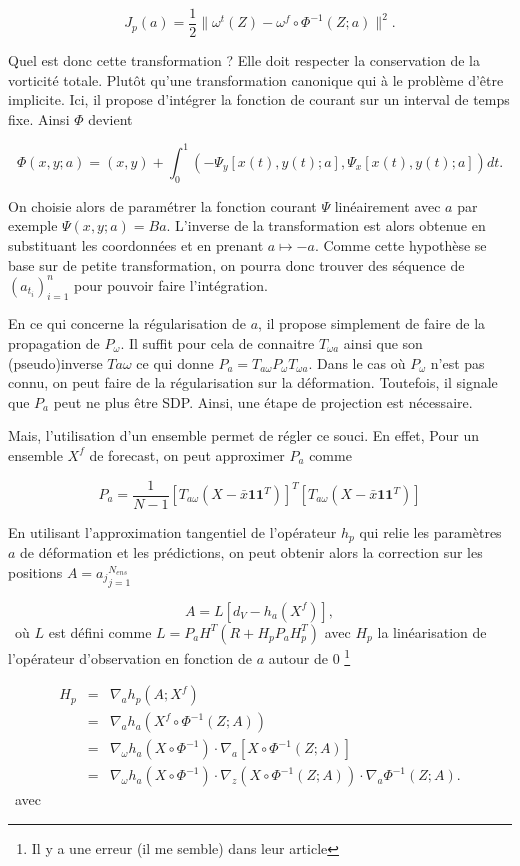 \documentclass{article}
\newcommand{\norm}[1]{\|#1\|}
\begin{document}
$$
    J_p(a) = \frac12 \norm{\omega^t(Z) - \omega^f \circ \Phi^{-1}(Z;a)}^2.
$$

Quel est donc cette transformation ? Elle doit respecter la conservation de la vorticité totale. Plutôt qu'une transformation canonique qui à le problème d'être implicite. Ici, il propose d'intégrer la fonction de courant sur un interval de temps fixe.
Ainsi $\Phi$ devient

$$
    \Phi(x,y;a) = (x, y) + \int_0^1 \left(-\Psi_y[x(t),y(t); a], \Psi_x[x(t), y(t); a]\right)dt.
$$

On choisie alors de paramétrer la fonction courant $\Psi$ linéairement avec $a$ par exemple $\Psi(x,y; a) = B a$. L'inverse de la transformation est alors obtenue en substituant les coordonnées et en prenant $a \mapsto -a$. Comme cette hypothèse se base sur de petite transformation, on pourra donc trouver des séquence de $(a_{t_i})_{i=1}^{n}$ pour pouvoir faire l'intégration.

En ce qui concerne la régularisation de $a$, il propose simplement de faire de la propagation de $P_{\omega}$. Il suffit pour cela de connaitre $T_{\omega a}$ ainsi que son (pseudo)inverse $T{a \omega}$ ce qui donne $P_a = T_{a \omega} P_{\omega} T_{\omega a}$. Dans le cas où $P_{\omega}$ n'est pas connu, on peut faire de la régularisation sur la déformation. Toutefois, il signale que $P_a$ peut ne plus être SDP. Ainsi, une étape de projection est nécessaire.

Mais, l'utilisation d'un ensemble permet de régler ce souci. En effet, Pour un ensemble $X^f$ de forecast, on peut approximer $P_a$ comme

$$
    P_a = \frac{1}{N-1} [T_{a \omega}(X - \bar x \bm{11}^T)]^T [T_{a \omega}(X - \bar x \bm{11}^T)]
$$

En utilisant l'approximation tangentiel de l'opérateur $h_p$ qui relie les paramètres $a$ de déformation et les prédictions, on peut obtenir alors la correction sur les positions $A = {a_j}_{j=1}^{N_{ens}}$

\begin{equation*}
    A = L \left[ d_V - h_a(X^f)\right],
\end{equation*}~où $L$ est défini comme $L = P_a H^T (R + H_p P_a H_p^T)$ avec $H_p$ la linéarisation de l'opérateur d'observation en fonction de $a$ autour de $0$ \footnote{Il y a une erreur (il me semble) dans leur article}

\begin{eqnarray*}
    H_p &=& \nabla_a h_p \left(A; X^f\right) \\
    &=& \nabla_a h_a(X^f \circ \Phi^{-1}(Z; A)) \\
    &=& \nabla_\omega h_a(X \circ \Phi^{-1}) \cdot \nabla_a [X \circ \Phi^{-1}(Z;A)] \\
    &=& \nabla_\omega h_a(X \circ \Phi^{-1}) \cdot \nabla_z (X\circ \Phi^{-1}(Z;A)) \cdot \nabla_a \Phi^{-1} (Z; A).
\end{eqnarray*}~avec
\end{document}

